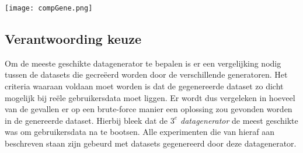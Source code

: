 \documentclass[Main.tex]{subfiles}
\begin{document}
\begin{center}
\texttt{[image: compGene.png]}
\end{center}

\subsection{Verantwoording keuze}
Om de meeste geschikte datagenerator te bepalen is er een vergelijking nodig tussen de datasets die gecre\"eerd worden door de verschillende generatoren. Het criteria waaraan voldaan moet worden is dat de gegenereerde dataset zo dicht mogelijk bij re\"ele gebruikersdata moet liggen. Er wordt dus vergeleken in hoeveel van de gevallen er op een brute-force manier een oplossing zou gevonden worden in de genereerde dataset. Hierbij bleek dat de \textit{$3^{e}$ datagenerator} de meest geschikte was om gebruikersdata na te bootsen. Alle experimenten die van hieraf aan beschreven staan zijn gebeurd met datasets gegenereerd door deze datagenerator.
\end{document}
